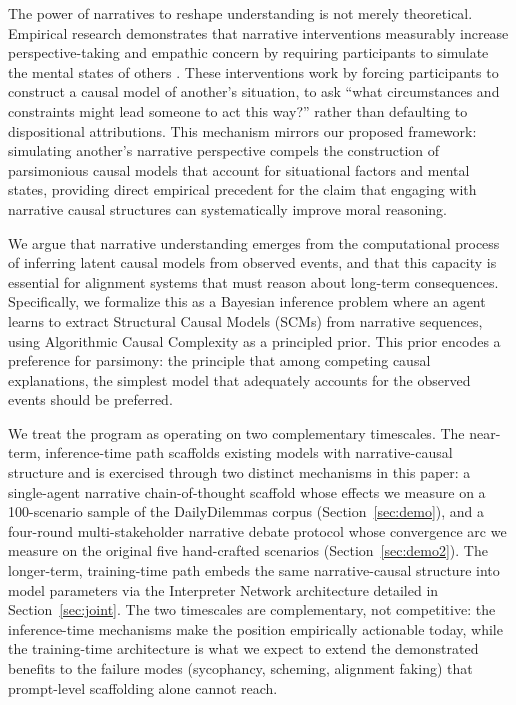 \documentclass{article}
\theoremstyle{plain}
\theoremstyle{definition}
\theoremstyle{remark}
\begin{document}
The power of narratives to reshape understanding is not merely theoretical. Empirical research demonstrates that narrative interventions measurably increase perspective-taking and empathic concern by requiring participants to simulate the mental states of others \citep{shaffer19, bientzle21, bientzle24}. These interventions work by forcing participants to construct a causal model of another's situation, to ask ``what circumstances and constraints might lead someone to act this way?'' rather than defaulting to dispositional attributions. This mechanism mirrors our proposed framework: simulating another's narrative perspective compels the construction of parsimonious causal models that account for situational factors and mental states, providing direct empirical precedent for the claim that engaging with narrative causal structures can systematically improve moral reasoning.

We argue that narrative understanding emerges from the computational process of inferring latent causal models from observed events, and that this capacity is essential for alignment systems that must reason about long-term consequences. Specifically, we formalize this as a Bayesian inference problem where an agent learns to extract Structural Causal Models (SCMs) from narrative sequences, using Algorithmic Causal Complexity as a principled prior. This prior encodes a preference for parsimony: the principle that among competing causal explanations, the simplest model that adequately accounts for the observed events should be preferred.

We treat the program as operating on two complementary timescales. The near-term, inference-time path scaffolds existing models with narrative-causal structure and is exercised through two distinct mechanisms in this paper: a single-agent narrative chain-of-thought scaffold whose effects we measure on a 100-scenario sample of the DailyDilemmas corpus (Section~\ref{sec:demo}), and a four-round multi-stakeholder narrative debate protocol whose convergence arc we measure on the original five hand-crafted scenarios (Section~\ref{sec:demo2}). The longer-term, training-time path embeds the same narrative-causal structure into model parameters via the Interpreter Network architecture detailed in Section~\ref{sec:joint}. The two timescales are complementary, not competitive: the inference-time mechanisms make the position empirically actionable today, while the training-time architecture is what we expect to extend the demonstrated benefits to the failure modes (sycophancy, scheming, alignment faking) that prompt-level scaffolding alone cannot reach.
\end{document}
